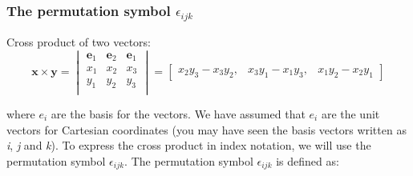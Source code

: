 \documentclass[notes]{beamer}
\begin{document}
\begin{frame}
	\frametitle{The permutation symbol $\epsilon_{ijk}$}
	Cross product of two vectors:
	\begin{equation*}
	\mathbf{x \times y} = 
	\begin{vmatrix}
	\mathbf{e}_1 & \mathbf{e}_2 & \mathbf{e}_1 \\
	x_1 & x_2 & x_3 \\
	y_1 & y_2 & y_3 \\
	\end{vmatrix} = 
	\begin{bmatrix}
	x_2 y_3 - x_3 y_2, & x_3 y_1 - x_1 y_3, &
	x_1 y_2 - x_2 y_1
	\end{bmatrix}
	\end{equation*}
	
	where $e_i$ are the basis for the vectors. We have assumed that $e_i$ are the unit vectors for
	Cartesian coordinates (you may have seen the basis vectors written as \textit{i}, \textit{j} and \textit{k}). To express the cross product in index notation, we will use the permutation symbol $\epsilon_{ijk}$. The permutation symbol $\epsilon_{ijk}$ is defined as:
	\mode<handout>{
		\vspace{1.5cm}
	} 
\end{frame}
\end{document}
